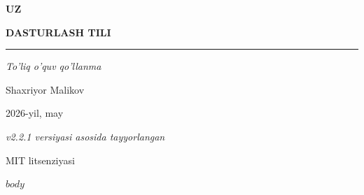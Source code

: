 \documentclass[a4paper,11pt,twoside,openright]{book}
\begin{document}
\frontmatter

\begin{titlepage}
\centering
\vspace*{2.5cm}

{\fontsize{96pt}{96pt}\selectfont\bfseries\sffamily\color{titlecolor}UZ\raisebox{-0.15em}{++}\par}

\vspace{1cm}

{\Huge\bfseries\sffamily\color{titlecolor}DASTURLASH TILI\par}

\vspace{0.5cm}
{\color{rulecolor}\rule{0.5\textwidth}{1pt}\par}
\vspace{1.5cm}

{\LARGE\itshape To'liq o'quv qo'llanma\par}

\vspace{4cm}

{\Large\sffamily Shaxriyor Malikov\par}
\vspace{0.5cm}
{\large 2026-yil, may\par}

\vfill

{\small\itshape v2.2.1 versiyasi asosida tayyorlangan\par}
{\small MIT litsenziyasi}
\end{titlepage}

\setcounter{tocdepth}{1}
\tableofcontents
\cleardoublepage

\mainmatter

$body$
\end{document}
